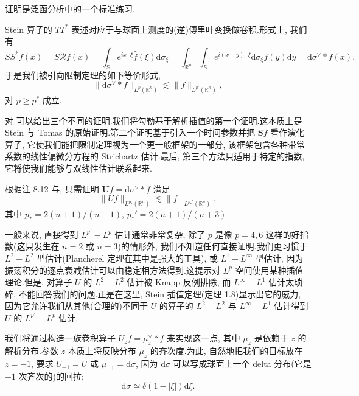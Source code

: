 证明是泛函分析中的一个标准练习.



Stein 算子的 $TT^*$ 表述对应于与球面上测度的(逆)傅里叶变换做卷积.形式上, 我们有
\[
SS^* f(x) = S\mathcal{R} f(x) = \int_{\mathbb{S}} e^{ix \cdot \xi} \hat{f}(\xi) \mathrm{d}\sigma_\xi = \int_{\mathbb{R}^n} \int_{\mathbb{S}} e^{i(x-y) \cdot \xi} \mathrm{d}\sigma_\xi f(y) \mathrm{d}y = \mathrm{d}\sigma^\vee * f(x).
\]
于是我们被引向限制定理的如下等价形式,
\begin{equation}
\|\mathrm{d}\sigma^\vee * f\|_{L^p(\mathbb{R}^n)} \lesssim \|f\|_{L^{p'}(\mathbb{R}^n)}, \label{eq:c6-285}
\end{equation}
对 $p \geq p^*$ 成立.

对 可以给出三个不同的证明.我们将勾勒基于解析插值的第一个证明.这本质上是 Stein 与 Tomas 的原始证明.第二个证明基于引入一个时间参数并把 $\boldsymbol{S} f$ 看作演化算子, 它使我们能把限制定理视为一个更一般框架的一部分, 该框架包含各种带常系数的线性偏微分方程的 Strichartz 估计.最后, 第三个方法只适用于特定的指数, 它将使我们能够与双线性估计联系起来.


根据注 8.12 与, 只需证明 $\boldsymbol{U} f = \mathrm{d}\sigma^\vee * f$ 满足
\begin{equation}
\|Uf\|_{L^{p_*}(\mathbb{R}^n)} \lesssim \|f\|_{L^{p_*'}(\mathbb{R}^n)}, \label{eq:c6-286}
\end{equation}
其中 $p_* = 2(n+1)/(n-1)$, $p_*' = 2(n+1)/(n+3)$.

一般来说, 直接得到 $L^{p'} - L^p$ 估计通常非常复杂, 除了 $p$ 是像 $p = 4, 6$ 这样的好指数(这只发生在 $n = 2$ 或 $n = 3$)的情形外, 我们不知道任何直接证明.我们更习惯于 $L^2 - L^2$ 型估计(Plancherel 定理在其中是强大的工具), 或 $L^1 - L^\infty$ 型估计, 因为振荡积分的逐点衰减估计可以由稳定相方法得到.这提示对 $L^p$ 空间使用某种插值理论.但是, 对算子 $U$ 的 $L^2 - L^2$ 估计被 Knapp 反例排除, 而 $L^\infty - L^1$ 估计太琐碎, 不能回答我们的问题.正是在这里, Stein 插值定理(定理 1.8)显示出它的威力, 因为它允许我们从其他(合理的)不同于 $U$ 的算子的 $L^2 - L^2$ 与 $L^\infty - L^1$ 估计得到 $U$ 的 $L^{p'} - L^p$ 估计.

我们将通过构造一族卷积算子 $U_z f = \mu_z^\vee * f$ 来实现这一点, 其中 $\mu_z$ 是依赖于 $z$ 的解析分布.参数 $z$ 本质上将反映分布 $\mu_z$ 的齐次度.为此, 自然地把我们的目标放在 $z = -1$, 要求 $U_{-1} = U$ 或 $\mu_{-1} = \mathrm{d}\sigma$, 因为 $\mathrm{d}\sigma$ 可以写成球面上一个 delta 分布(它是 $-1$ 次齐次的)的回拉:
\[
\mathrm{d}\sigma \simeq \delta(1 - |\xi|) \mathrm{d}\xi.
\]

